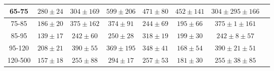 \begin{table}[h]
\begin{center}
\begin{tabular}{|c|c|c|c|c|c|c|c|}
    65-75 & $280\pm24$ & $304\pm169$ & $599\pm206$ & $471\pm80$ & $452\pm141$ &$304\pm295\pm166$  \\ \hline
    75-85 & $186\pm20$ & $375\pm162$ & $374\pm91$ & $244\pm69$ & $195\pm66$ &$375\pm1\pm161$  \\ \hline
    85-95 & $139\pm17$ & $242\pm60$ & $250\pm28$ & $318\pm19$ & $199\pm30$ &$242\pm8\pm57$  \\ \hline
    95-120 & $208\pm21$ & $390\pm55$ & $369\pm195$ & $348\pm41$ & $168\pm54$ &$390\pm21\pm51$  \\ \hline
    120-500 & $157\pm18$ & $255\pm88$ & $294\pm17$ & $257\pm53$ & $181\pm30$ &$255\pm38\pm85$  \\ \hline
  \end{tabular}
  \label{tab:diff_ways_to_fit_phoEt_ENDCAP_muon}
  \end{center}
\end{table}

